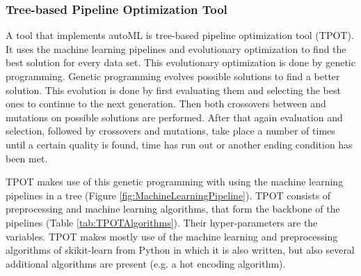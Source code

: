 	
	\subsubsection{Tree-based Pipeline Optimization Tool}
	\label{subsec:TPOT}
	
	A tool that implements autoML is tree-based pipeline optimization tool (TPOT). It uses the machine learning pipelines and evolutionary optimization to find the best solution for every data set. This evolutionary optimization is done by genetic programming. Genetic programming evolves possible solutions to find a better solution. This evolution is done by first evaluating them and selecting the best ones to continue to the next generation. Then both crossovers between and mutations on possible solutions are performed. After that again evaluation and selection, followed by crossovers and mutations, take place a number of times until a certain quality is found, time has run out or another ending condition has been met.
	
	TPOT makes use of this genetic programming with using the machine learning pipelines in a tree (Figure \ref{fig:MachineLearningPipeline}). TPOT consists of preprocessing and machine learning algorithms, that form the backbone of the pipelines (Table \ref{tab:TPOTAlgorithms}). Their hyper-parameters are the variables. TPOT makes mostly use of the machine learning and preprocessing algorithms of skikit-learn from Python in which it is also written, but also several additional algorithms are present (e.g. a hot encoding algorithm).
	
